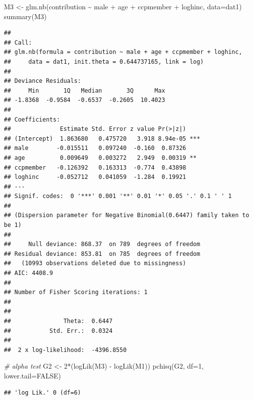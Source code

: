 \documentclass[
]{ctexart}
\newenvironment{Shaded}{\begin{snugshade}}{\end{snugshade}}
\newcommand{\AttributeTok}[1]{\textcolor[rgb]{0.77,0.63,0.00}{#1}}
\newcommand{\CommentTok}[1]{\textcolor[rgb]{0.56,0.35,0.01}{\textit{#1}}}
\newcommand{\ConstantTok}[1]{\textcolor[rgb]{0.00,0.00,0.00}{#1}}
\newcommand{\DecValTok}[1]{\textcolor[rgb]{0.00,0.00,0.81}{#1}}
\newcommand{\FunctionTok}[1]{\textcolor[rgb]{0.00,0.00,0.00}{#1}}
\newcommand{\NormalTok}[1]{#1}
\newcommand{\OtherTok}[1]{\textcolor[rgb]{0.56,0.35,0.01}{#1}}
\newcommand{\SpecialCharTok}[1]{\textcolor[rgb]{0.00,0.00,0.00}{#1}}
\begin{document}
\begin{Shaded}
\begin{Highlighting}[]
\NormalTok{M3 }\OtherTok{\textless{}{-}} \FunctionTok{glm.nb}\NormalTok{(contribution }\SpecialCharTok{\textasciitilde{}}\NormalTok{ male }\SpecialCharTok{+}\NormalTok{ age }\SpecialCharTok{+}\NormalTok{ ccpmember }\SpecialCharTok{+}\NormalTok{ loghinc, }\AttributeTok{data=}\NormalTok{dat1)}
\FunctionTok{summary}\NormalTok{(M3)}
\end{Highlighting}
\end{Shaded}

\begin{verbatim}
## 
## Call:
## glm.nb(formula = contribution ~ male + age + ccpmember + loghinc, 
##     data = dat1, init.theta = 0.644737165, link = log)
## 
## Deviance Residuals: 
##     Min       1Q   Median       3Q      Max  
## -1.8368  -0.9584  -0.6537  -0.2605  10.4023  
## 
## Coefficients:
##              Estimate Std. Error z value Pr(>|z|)    
## (Intercept)  1.863680   0.475720   3.918 8.94e-05 ***
## male        -0.015511   0.097240  -0.160  0.87326    
## age          0.009649   0.003272   2.949  0.00319 ** 
## ccpmember   -0.126392   0.163313  -0.774  0.43898    
## loghinc     -0.052712   0.041059  -1.284  0.19921    
## ---
## Signif. codes:  0 '***' 0.001 '**' 0.01 '*' 0.05 '.' 0.1 ' ' 1
## 
## (Dispersion parameter for Negative Binomial(0.6447) family taken to be 1)
## 
##     Null deviance: 868.37  on 789  degrees of freedom
## Residual deviance: 853.81  on 785  degrees of freedom
##   (10993 observations deleted due to missingness)
## AIC: 4408.9
## 
## Number of Fisher Scoring iterations: 1
## 
## 
##               Theta:  0.6447 
##           Std. Err.:  0.0324 
## 
##  2 x log-likelihood:  -4396.8550
\end{verbatim}

\begin{Shaded}
\begin{Highlighting}[]
\CommentTok{\# alpha test}
\NormalTok{G2 }\OtherTok{\textless{}{-}} \DecValTok{2}\SpecialCharTok{*}\NormalTok{(}\FunctionTok{logLik}\NormalTok{(M3) }\SpecialCharTok{{-}} \FunctionTok{logLik}\NormalTok{(M1))}
\FunctionTok{pchisq}\NormalTok{(G2, }\AttributeTok{df=}\DecValTok{1}\NormalTok{, }\AttributeTok{lower.tail=}\ConstantTok{FALSE}\NormalTok{)}
\end{Highlighting}
\end{Shaded}

\begin{verbatim}
## 'log Lik.' 0 (df=6)
\end{verbatim}
\end{document}
